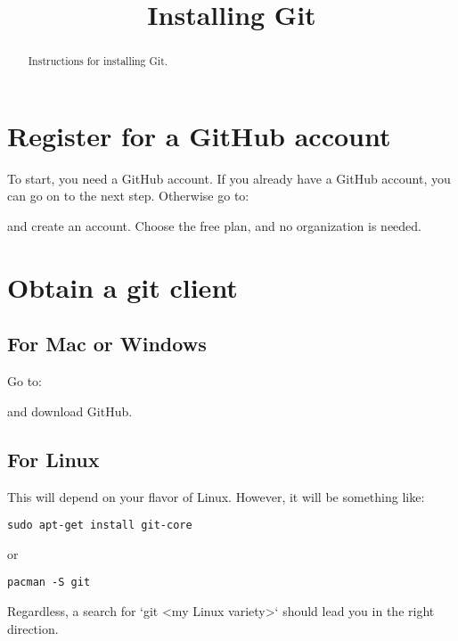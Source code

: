 \documentclass{ximera}
\title{Installing Git}
\begin{document}
\begin{abstract}
  Instructions for installing Git.
\end{abstract}
\maketitle


\section{Register for a GitHub account}

To start, you need a GitHub account. If you already have a GitHub
account, you can go on to the next step. Otherwise go to:




and create an account. Choose the free plan, and no organization is
needed.


\section{Obtain a git client}

\subsection{For Mac or Windows}

Go to: 




and download GitHub.

\subsection{For Linux}

This will depend on your flavor of Linux. However, it will be
something like:
\begin{verbatim}
sudo apt-get install git-core
\end{verbatim}
or
\begin{verbatim}
pacman -S git
\end{verbatim}
Regardless, a search for `git <my Linux variety>` should lead you in
the right direction.
\end{document}
